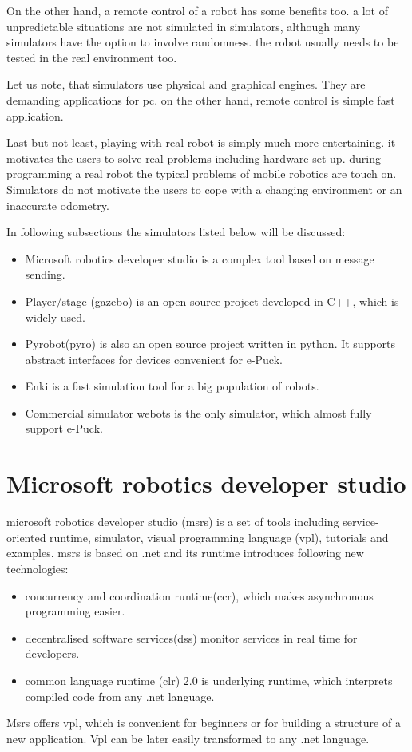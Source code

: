   On the other hand, a remote control of a robot has some benefits too. 
  a lot of unpredictable situations are not simulated in simulators, although 
  many simulators have the option to involve randomness. the robot usually
  needs to be tested in the real environment too.
  
  Let us note, that simulators use physical and graphical engines. They are demanding applications
  for pc. 
  on the other hand, remote control is simple fast application.
  
  Last but not least, playing with real robot is simply much more entertaining. 	
  it motivates the users to solve real problems including hardware set up. 
  during programming a real robot the typical problems of mobile robotics are touch on.
  Simulators do not motivate the users to cope with a changing environment or an inaccurate odometry.
  
  In following subsections the simulators listed below will be discussed:
  \begin{itemize}
  \item Microsoft robotics developer studio\cite{msrs} is a complex tool based on message sending.
  \item Player/stage\cite{player} (gazebo) is an open source project developed in C++, which is widely used.
  \item Pyrobot(pyro)\cite{pyro} is also an open source project written in python. It supports abstract
  interfaces for devices convenient for e-Puck.
  \item Enki\cite{enki} is a fast simulation tool for a big population of robots.
  \item Commercial simulator webots\cite{webots} is the only simulator, which almost fully support e-Puck. 
  \end{itemize}
\section{Microsoft robotics developer studio\cite{msrs}} 
  microsoft robotics developer studio (msrs) is a set of tools including service-oriented runtime,
  simulator, visual programming language (vpl),
  tutorials and examples. msrs is based on .net and its runtime introduces following new technologies:
  \begin{itemize}
  \item concurrency and coordination runtime(ccr), which makes asynchronous programming easier.
  \item decentralised software services(dss) monitor services in real time for developers.
  \item common language runtime (clr) 2.0 is underlying runtime, 
          which interprets compiled code from any .net language.
  \end{itemize}	
  Msrs offers vpl, which is convenient for beginners or for building a structure of a new application.
  Vpl can be later easily transformed to any .net language.
  

